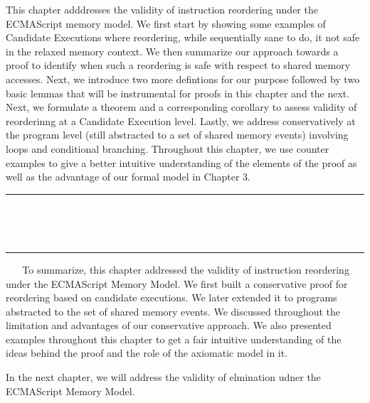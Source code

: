 This chapter adddresses the validity of instruction reordering under the ECMAScript memory model.
We first start by showing some examples of Candidate Executions where reordering, while sequentially sane to do, it not safe in the relaxed memory context.  
We then summarize our approach towards a proof to identify when such a reordering is safe with respect to shared memory accesses. 
Next, we introduce two more defintions for our purpose followed by two basic lemmas that will be instrumental for proofs in this chapter and the next. 
Next, we formulate a theorem and a corresponding corollary to assess validity of reorderinng at a Candidate Execution level. 
Lastly, we address conservatively at the program level (still abstracted to a set of shared memory events) involving loops and conditional branching.
Throughout this chapter, we use counter examples to give a better intuitive understanding of the elements of the proof as well as the advantage of our formal model in Chapter 3.
\ \newline
\ \newline  
\hrule 
\ \newline 
\ \newline 













\ \newline
\ \newline  
\hrule 
\ \newline 
\ \newline 
To summarize, this chapter addressed the validity of instruction reordering under the ECMAScript Memory Model. 
We first built a conservative proof for reordering based on candidate executions.
We later extended it to programs abstracted to the set of shared memory events. 
We discussed throughout the limitation and advantages of our conservative approach. 
We also presented examples throughout this chapter to get a fair intuitive understanding of the ideas behind the proof and the role of the axiomatic model in it.

In the next chapter, we will address the validity of elmination udner the ECMAScript Memory Model.